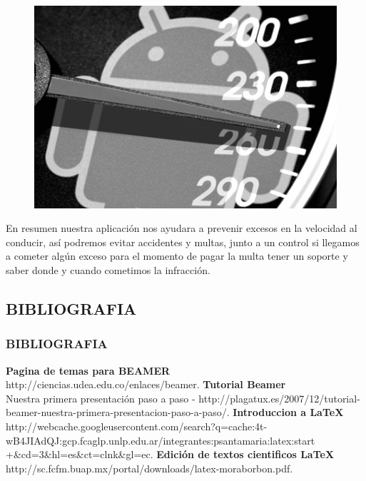 \documentclass{beamer}						%
\begin{document}
\begin{frame}[allowframebreaks]
{			\begin{figure}[H]%
				\centering
				\includegraphics[scale=0.5]{./images/andspeed.jpg}
			\end{figure}
			
			En resumen nuestra aplicación nos ayudara a prevenir excesos en la velocidad al conducir, así podremos evitar
 			accidentes y multas, junto a un control si llegamos a cometer algún exceso para el momento de pagar la multa tener
 			un soporte y saber donde y cuando cometimos la infracción.}
			
	\end{frame}

	\begin{frame}
		\section{BIBLIOGRAFIA}
		\frametitle{BIBLIOGRAFIA}
		
		\begin{thebibliography}{99}
			\normalsize
			 \textbf{Pagina de temas para BEAMER}\\ http://ciencias.udea.edu.co/enlaces/beamer.
			 \textbf{Tutorial Beamer}\\ Nuestra primera presentación paso a paso - http://plagatux.es/2007/12/tutorial-beamer-nuestra-primera-presentacion-paso-a-paso/.
			 \textbf{Introduccion a \LaTeX}\\ http://webcache.googleusercontent.com/search?q=cache:4t-wB4JIAdQJ:gcp.fcaglp.unlp.edu.ar/integrantes:psantamaria:latex:start\\+\&cd=3\&hl=es\&ct=clnk\&gl=ec.
			 \textbf{Edición de textos cientificos \LaTeX}\\http://sc.fcfm.buap.mx/portal/downloads/latex-moraborbon.pdf.
		\end{thebibliography}
		
	\end{frame}
	
\end{document}

